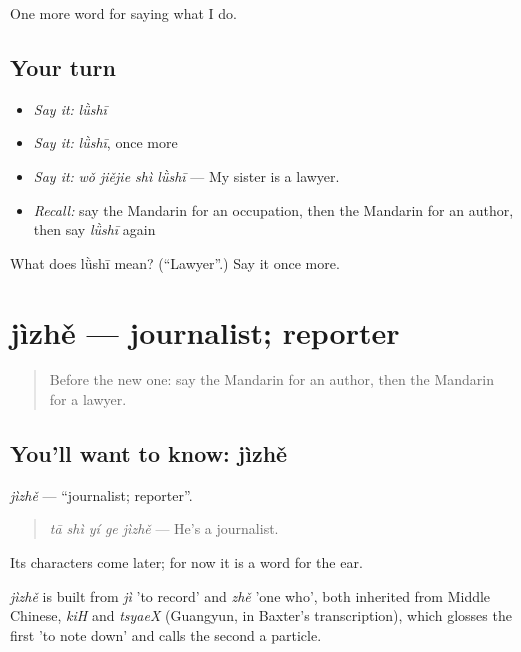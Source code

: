 \begin{grammarlens}[title={What you've built}]
One more word for saying what I do.
\end{grammarlens}

\subsection*{Your turn}
\begin{itemize}
\raggedright
  \item \emph{Say it:} \emph{lǜshī}
  \item \emph{Say it:} \emph{lǜshī}, once more
  \item \emph{Say it:} \emph{wǒ jiějie shì lǜshī} — My sister is a lawyer.
  \item \emph{Recall:} say the Mandarin for an occupation, then the Mandarin for an author, then say \emph{lǜshī} again
\end{itemize}

\begin{tcolorbox}[breakable,colback=teal!4,colframe=teal!35!black,title={Before you move on}]
What does lǜshī mean? (\textquotedblleft{}Lawyer\textquotedblright{}.) Say it once more.
\end{tcolorbox}
\section[jìzhě]{jìzhě — journalist; reporter}

\label{lesson:ZH-C259-jizhe}



\begin{quote}
Before the new one: say the Mandarin for an author, then the Mandarin for a lawyer.
\end{quote}

\subsection*{You'll want to know: jìzhě}
\emph{jìzhě} — \textquotedblleft{}journalist; reporter\textquotedblright{}.

\begin{quote}
\emph{tā shì yí ge jìzhě} — He's a journalist.
\end{quote}

Its characters come later; for now it is a word for the ear.

\begin{cousinweb}
\emph{jìzhě} is built from \emph{jì} 'to record' and \emph{zhě} 'one who', both inherited from Middle Chinese, \emph{kiH} and \emph{tsyaeX} (Guangyun, in Baxter's transcription), which glosses the first 'to note down' and calls the second a particle.
\end{cousinweb}

